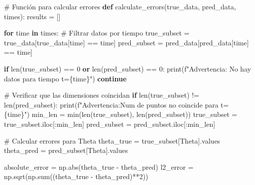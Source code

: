 \documentclass[
  spanish,
  us-letterpaper,
]{scrreprt}
\newenvironment{Shaded}{\begin{snugshade}}{\end{snugshade}}
\newcommand{\BuiltInTok}[1]{\textcolor[rgb]{0.00,0.23,0.31}{#1}}
\newcommand{\CommentTok}[1]{\textcolor[rgb]{0.37,0.37,0.37}{#1}}
\newcommand{\ControlFlowTok}[1]{\textcolor[rgb]{0.00,0.23,0.31}{\textbf{#1}}}
\newcommand{\DecValTok}[1]{\textcolor[rgb]{0.68,0.00,0.00}{#1}}
\newcommand{\KeywordTok}[1]{\textcolor[rgb]{0.00,0.23,0.31}{\textbf{#1}}}
\newcommand{\NormalTok}[1]{\textcolor[rgb]{0.00,0.23,0.31}{#1}}
\newcommand{\OperatorTok}[1]{\textcolor[rgb]{0.37,0.37,0.37}{#1}}
\newcommand{\SpecialCharTok}[1]{\textcolor[rgb]{0.37,0.37,0.37}{#1}}
\newcommand{\SpecialStringTok}[1]{\textcolor[rgb]{0.13,0.47,0.30}{#1}}
\newcommand{\StringTok}[1]{\textcolor[rgb]{0.13,0.47,0.30}{#1}}
\theoremstyle{plain}
\theoremstyle{definition}
\theoremstyle{remark}
\begin{document}
\begin{Shaded}
\begin{Highlighting}[]
\CommentTok{\# Función para calcular errores}
\KeywordTok{def}\NormalTok{ calculate\_errors(true\_data, pred\_data, times):}
\NormalTok{    results }\OperatorTok{=}\NormalTok{ []}
    
    \ControlFlowTok{for}\NormalTok{ time }\KeywordTok{in}\NormalTok{ times:}
        \CommentTok{\# Filtrar datos por tiempo}
\NormalTok{        true\_subset }\OperatorTok{=}\NormalTok{ true\_data[true\_data[}\StringTok{\textquotesingle{}time\textquotesingle{}}\NormalTok{] }\OperatorTok{==}\NormalTok{ time]}
\NormalTok{        pred\_subset }\OperatorTok{=}\NormalTok{ pred\_data[pred\_data[}\StringTok{\textquotesingle{}time\textquotesingle{}}\NormalTok{] }\OperatorTok{==}\NormalTok{ time]}
        
        \ControlFlowTok{if} \BuiltInTok{len}\NormalTok{(true\_subset) }\OperatorTok{==} \DecValTok{0} \KeywordTok{or} \BuiltInTok{len}\NormalTok{(pred\_subset) }\OperatorTok{==} \DecValTok{0}\NormalTok{:}
            \BuiltInTok{print}\NormalTok{(}\SpecialStringTok{f"Advertencia: No hay datos para tiempo t=}\SpecialCharTok{\{}\NormalTok{time}\SpecialCharTok{\}}\SpecialStringTok{"}\NormalTok{)}
            \ControlFlowTok{continue}
        
        \CommentTok{\# Verificar que las dimensiones coincidan}
        \ControlFlowTok{if} \BuiltInTok{len}\NormalTok{(true\_subset) }\OperatorTok{!=} \BuiltInTok{len}\NormalTok{(pred\_subset):}
            \BuiltInTok{print}\NormalTok{(}\SpecialStringTok{f"Advertencia:Num de puntos no coincide para t=}\SpecialCharTok{\{}\NormalTok{time}\SpecialCharTok{\}}\SpecialStringTok{"}\NormalTok{)}
\NormalTok{            min\_len }\OperatorTok{=} \BuiltInTok{min}\NormalTok{(}\BuiltInTok{len}\NormalTok{(true\_subset), }\BuiltInTok{len}\NormalTok{(pred\_subset))}
\NormalTok{            true\_subset }\OperatorTok{=}\NormalTok{ true\_subset.iloc[:min\_len]}
\NormalTok{            pred\_subset }\OperatorTok{=}\NormalTok{ pred\_subset.iloc[:min\_len]}
        
        \CommentTok{\# Calcular errores para Theta}
\NormalTok{        theta\_true }\OperatorTok{=}\NormalTok{ true\_subset[}\StringTok{\textquotesingle{}Theta\textquotesingle{}}\NormalTok{].values}
\NormalTok{        theta\_pred }\OperatorTok{=}\NormalTok{ pred\_subset[}\StringTok{\textquotesingle{}Theta\textquotesingle{}}\NormalTok{].values}
        
\NormalTok{        absolute\_error }\OperatorTok{=}\NormalTok{ np.}\BuiltInTok{abs}\NormalTok{(theta\_true }\OperatorTok{{-}}\NormalTok{ theta\_pred)}
\NormalTok{        l2\_error }\OperatorTok{=}\NormalTok{ np.sqrt(np.}\BuiltInTok{sum}\NormalTok{((theta\_true }\OperatorTok{{-}}\NormalTok{ theta\_pred)}\OperatorTok{**}\DecValTok{2}\NormalTok{))}
        

\end{Highlighting}
\end{Shaded}
\end{document}
